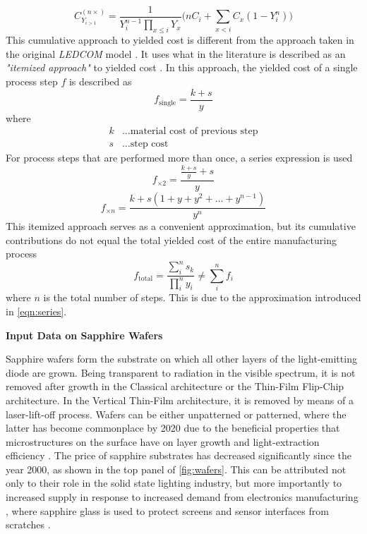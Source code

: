 \documentclass[parskip=full]{article}
\begin{document}
%
\begin{equation}
\label{eqn:yielded_cost}
    C_{Y_{i>1}}^{(n \times)} = \frac{1}{Y_i^{n-1} \prod_{x \leq i} Y_x} \bigg( nC_i + \sum_{x < i} C_x (1-Y_i^n) \bigg)
\end{equation}
%
This cumulative approach to yielded cost is different from the approach taken in the original \textit{LEDCOM} model \cite{ledcomv2}. It uses what in the literature is described as an \textit{"itemized approach"} to yielded cost \cite{becker2001use}. In this approach, the yielded cost of a single process step $f$ is described as
%
\begin{equation}
    f_\text{single} = \frac{k+s}{y}
\end{equation}
%
where
%
\begin{align*}
    k &\dots \text{material cost of previous step} \\
    s &\dots \text{step cost}
\end{align*}
%
For process steps that are performed more than once, a series expression is used
%
\begin{equation}
    f_{\times 2} =  \frac{\frac{k+s}{y}+s}{y}
\end{equation}
\begin{equation}
\label{eqn:series}
    f_{\times n} = \frac{k + s(1+y+y^2+ \dots + y^{n-1})}{y^n}
\end{equation}
%
This itemized approach serves as a convenient approximation, but its cumulative contributions do not equal the total yielded cost of the entire manufacturing process
%
\begin{equation}
    f_\text{total} = \frac{\sum_i^n s_k}{\prod_i^n y_i} \neq \sum_i^n f_i
\end{equation}
%
where $n$ is the total number of steps. This is due to the approximation introduced in \cref{eqn:series}.

\textbf{Input Data on Sapphire Wafers}

Sapphire wafers form the substrate on which all other layers of the light-emitting diode are grown. Being transparent to radiation in the visible spectrum, it is not removed after growth in the Classical architecture or the Thin-Film Flip-Chip architecture. In the Vertical Thin-Film architecture, it is removed by means of a laser-lift-off process. Wafers can be either unpatterned or patterned, where the latter has become commonplace by 2020 due to the beneficial properties that microstructures on the surface have on layer growth \cite{wuu2009defect} and light-extraction efficiency \cite{lee2006enhancing}. The price of sapphire substrates has decreased significantly since the year 2000, as shown in the top panel of \cref{fig:wafers}. This can be attributed not only to their role in the solid state lighting industry, but more importantly to increased supply in response to increased demand from electronics manufacturing \cite{yole2015sapphire}, where sapphire glass is used to protect screens and sensor interfaces from scratches \cite{khattak2016world}.
\end{document}
